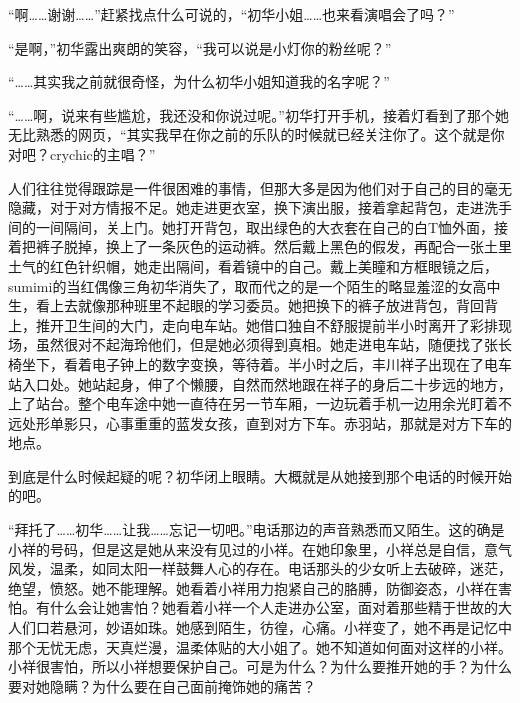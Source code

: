 \documentclass{article}
\begin{document}
“啊……谢谢……”赶紧找点什么可说的，“初华小姐……也来看演唱会了吗？”



“是啊，”初华露出爽朗的笑容，“我可以说是小灯你的粉丝呢？”



“……其实我之前就很奇怪，为什么初华小姐知道我的名字呢？”



“……啊，说来有些尴尬，我还没和你说过呢。”初华打开手机，接着灯看到了那个她无比熟悉的网页，“其实我早在你之前的乐队的时候就已经关注你了。这个就是你对吧？crychic的主唱？”



\newpage



人们往往觉得跟踪是一件很困难的事情，但那大多是因为他们对于自己的目的毫无隐藏，对于对方情报不足。她走进更衣室，换下演出服，接着拿起背包，走进洗手间的一间隔间，关上门。她打开背包，取出绿色的大衣套在自己的白T恤外面，接着把裤子脱掉，换上了一条灰色的运动裤。然后戴上黑色的假发，再配合一张土里土气的红色针织帽，她走出隔间，看着镜中的自己。戴上美瞳和方框眼镜之后，sumimi的当红偶像三角初华消失了，取而代之的是一个陌生的略显羞涩的女高中生，看上去就像那种班里不起眼的学习委员。她把换下的裤子放进背包，背回背上，推开卫生间的大门，走向电车站。她借口独自不舒服提前半小时离开了彩排现场，虽然很对不起海玲他们，但是她必须得到真相。她走进电车站，随便找了张长椅坐下，看着电子钟上的数字变换，等待着。半小时之后，丰川祥子出现在了电车站入口处。她站起身，伸了个懒腰，自然而然地跟在祥子的身后二十步远的地方，上了站台。整个电车途中她一直待在另一节车厢，一边玩着手机一边用余光盯着不远处形单影只，心事重重的蓝发女孩，直到对方下车。赤羽站，那就是对方下车的地点。



到底是什么时候起疑的呢？初华闭上眼睛。大概就是从她接到那个电话的时候开始的吧。



“拜托了……初华……让我……忘记一切吧。”电话那边的声音熟悉而又陌生。这的确是小祥的号码，但是这是她从来没有见过的小祥。在她印象里，小祥总是自信，意气风发，温柔，如同太阳一样鼓舞人心的存在。电话那头的少女听上去破碎，迷茫，绝望，愤怒。她不能理解。她看着小祥用力抱紧自己的胳膊，防御姿态，小祥在害怕。有什么会让她害怕？她看着小祥一个人走进办公室，面对着那些精于世故的大人们口若悬河，妙语如珠。她感到陌生，彷徨，心痛。小祥变了，她不再是记忆中那个无忧无虑，天真烂漫，温柔体贴的大小姐了。她不知道如何面对这样的小祥。小祥很害怕，所以小祥想要保护自己。可是为什么？为什么要推开她的手？为什么要对她隐瞒？为什么要在自己面前掩饰她的痛苦？
\end{document}
